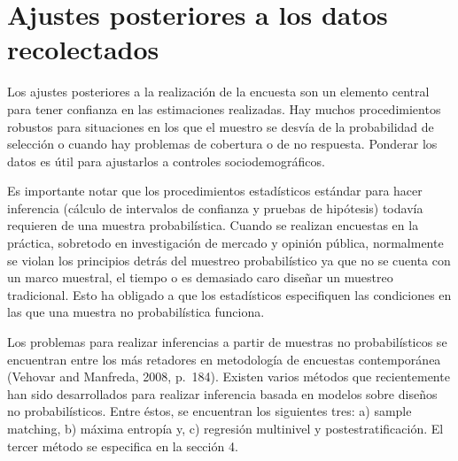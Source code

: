 \documentclass[]{article}
\begin{document}
\section{Ajustes posteriores a los datos
recolectados}\label{ajustes-posteriores-a-los-datos-recolectados}

Los ajustes posteriores a la realización de la encuesta son un elemento
central para tener confianza en las estimaciones realizadas. Hay muchos
procedimientos robustos para situaciones en los que el muestro se desvía
de la probabilidad de selección o cuando hay problemas de cobertura o de
no respuesta. Ponderar los datos es útil para ajustarlos a controles
sociodemográficos.

Es importante notar que los procedimientos estadísticos estándar para
hacer inferencia (cálculo de intervalos de confianza y pruebas de
hipótesis) todavía requieren de una muestra probabilística. Cuando se
realizan encuestas en la práctica, sobretodo en investigación de mercado
y opinión pública, normalmente se violan los principios detrás del
muestreo probabilístico ya que no se cuenta con un marco muestral, el
tiempo o es demasiado caro diseñar un muestreo tradicional. Esto ha
obligado a que los estadísticos especifiquen las condiciones en las que
una muestra no probabilística funciona.

Los problemas para realizar inferencias a partir de muestras no
probabilísticos se encuentran entre los más retadores en metodología de
encuestas contemporánea (Vehovar and Manfreda, 2008, p.~184). Existen
varios métodos que recientemente han sido desarrollados para realizar
inferencia basada en modelos sobre diseños no probabilísticos. Entre
éstos, se encuentran los siguientes tres: a) sample matching, b) máxima
entropía y, c) regresión multinivel y postestratificación. El tercer
método se especifica en la sección 4.
\end{document}
